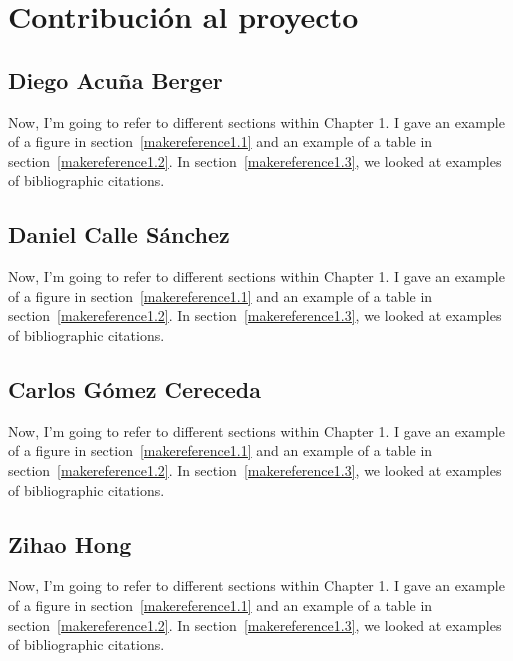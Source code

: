 
\cleardoublepage


\chapter{Contribución al proyecto}
\label{makereference9}

\section{Diego Acuña Berger}
\label{makereference9.1} Now, I'm going to refer to different
sections within Chapter 1. I gave an example of a figure in
section~\ref{makereference1.1} and an example of a table in
section~\ref{makereference1.2}.  In
section~\ref{makereference1.3}, we looked at examples of
bibliographic citations.

\section{Daniel Calle Sánchez}
\label{makereference9.2} Now, I'm going to refer to different
sections within Chapter 1. I gave an example of a figure in
section~\ref{makereference1.1} and an example of a table in
section~\ref{makereference1.2}.  In
section~\ref{makereference1.3}, we looked at examples of
bibliographic citations.

\section{Carlos Gómez Cereceda}
\label{makereference9.3} Now, I'm going to refer to different
sections within Chapter 1. I gave an example of a figure in
section~\ref{makereference1.1} and an example of a table in
section~\ref{makereference1.2}.  In
section~\ref{makereference1.3}, we looked at examples of
bibliographic citations.

\section{Zihao Hong}
\label{makereference9.4} Now, I'm going to refer to different
sections within Chapter 1. I gave an example of a figure in
section~\ref{makereference1.1} and an example of a table in
section~\ref{makereference1.2}.  In
section~\ref{makereference1.3}, we looked at examples of
bibliographic citations.